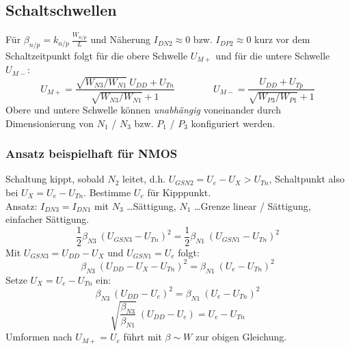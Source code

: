 \documentclass[a4paper,11pt]{article}
\begin{document}
\subsection*{Schaltschwellen}
Für $\beta_{n/p} = k_{n/p} ~ \frac{W_{n/p}}{L}$ und Näherung $I_{DN2} \approx 0$ bzw. $I_{DP2} \approx 0$ kurz vor dem Schaltzeitpunkt folgt für die obere Schwelle $U_{M+}$ und für die untere Schwelle $U_{M-}$:
\[
	\boxed { \quad U_{M+} = \frac{\sqrt{W_{N3} / W_{N1}} ~ U_{DD} + U_{Tn}}{\sqrt{W_{N3}/W_{N1}} + 1} \quad } \qquad \boxed { \quad U_{M-} = \frac{U_{DD} + U_{Tp}}{\sqrt{W_{P3}/W_{P1}} + 1} \quad }
\]
Obere und untere Schwelle können \textit{unabhängig} voneinander durch Dimensionierung von $N_1$ / $N_3$ bzw. $P_1$ / $P_3$ konfiguriert werden.

\subsubsection*{Ansatz beispielhaft für NMOS}
Schaltung kippt, sobald $N_2$ leitet, d.h. $U_{GSN2} = U_e - U_X > U_{Tn}$, Schaltpunkt also bei $U_X = U_e - U_{Tn}$. Bestimme $U_e$ für Kipppunkt.\\
Ansatz: $I_{DN3} = I_{DN1}$ mit $N_3$ \ldots Sättigung, $N_1$ \ldots Grenze linear / Sättigung, einfacher Sättigung.
\[
	\frac{1}{2} \beta_{N3} ~ (U_{GSN3} - U_{Tn})^2 = \frac{1}{2} \beta_{N1} ~ (U_{GSN1} - U_{Tn})^2
\]
Mit $U_{GSN3} = U_{DD} - U_X$ und $U_{GSN1} = U_e$ folgt:
\[
	\beta_{N3} ~ (U_{DD} - U_X - U_{Tn})^2 =\beta_{N1} ~ (U_e - U_{Tn})^2	
\]
Setze $U_X = U_e - U_{Tn}$ ein:
\[
	\beta_{N3} ~ (U_{DD} - U_e)^2 =\beta_{N1} ~ (U_e - U_{Tn})^2	
\]
\[
	\sqrt{\frac{\beta_{N3}}{\beta_{N1}}} ~ (U_{DD} - U_e) = U_e - U_{Tn}
\]
Umformen nach $U_{M+} = U_e$ führt mit $\beta \sim W$ zur obigen Gleichung.
\end{document}
